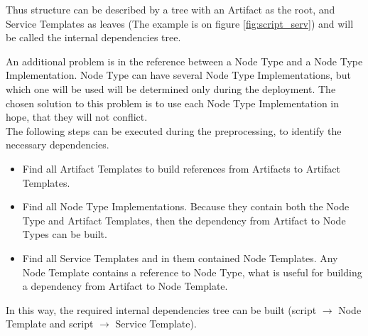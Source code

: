 Thus structure can be described by a tree with an Artifact as the root, and Service Templates as leaves (The example is on figure \ref{fig:script_serv}) and will be called the internal dependencies tree.

An additional problem is in the reference between a Node Type and a Node Type Implementation.
Node Type can have several Node Type Implementations, but which one will be used will be determined only during the deployment. 
The chosen solution to this problem is to use each Node Type Implementation in hope, that they will not conflict.\\
The following steps can be executed during the preprocessing, to identify the necessary dependencies.
\begin{itemize}
	\item Find all Artifact Templates to build references from Artifacts to Artifact Templates.
	\item Find all Node Type Implementations. Because they contain both the Node Type and Artifact Templates, then the dependency from Artifact to Node Types can be built.
	\item Find all Service Templates and in them contained Node Templates. Any Node Template contains a reference to Node Type, what is useful for building a dependency from Artifact to Node Template.
\end{itemize} 
In this way, the required internal dependencies tree can be built (script $\rightarrow$ Node Template and script $\rightarrow$ Service Template).
